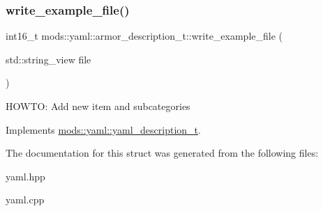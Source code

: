 \subsubsection{\texorpdfstring{write\+\_\+example\+\_\+file()}{write\_example\_file()}}
{\footnotesize\ttfamily int16\+\_\+t mods\+::yaml\+::armor\+\_\+description\+\_\+t\+::write\+\_\+example\+\_\+file (\begin{DoxyParamCaption}\item[{std\+::string\+\_\+view}]{file }\end{DoxyParamCaption})\hspace{0.3cm}{\ttfamily [virtual]}}

H\+O\+W\+TO\+: Add new item and subcategories 

Implements \hyperlink{structmods_1_1yaml_1_1yaml__description__t}{mods\+::yaml\+::yaml\+\_\+description\+\_\+t}.



The documentation for this struct was generated from the following files\+:\begin{DoxyCompactItemize}
\item 
yaml.\+hpp\item 
yaml.\+cpp\end{DoxyCompactItemize}
